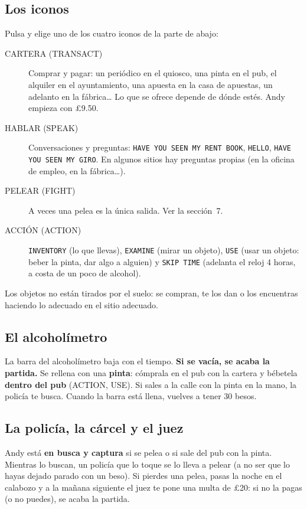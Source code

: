 \subsection*{Los iconos}
Pulsa  y elige uno de los cuatro iconos de la parte de abajo:

\begin{description}
\item[CARTERA (TRANSACT)] Comprar y pagar: un peri\'odico en el quiosco, una pinta en el pub, el alquiler en el ayuntamiento, una apuesta en la casa de apuestas, un adelanto en la f\'abrica\ldots{} Lo que se ofrece depende de d\'onde est\'es. Andy empieza con \pounds 9.50.
\item[HABLAR (SPEAK)] Conversaciones y preguntas: \texttt{HAVE YOU SEEN MY RENT BOOK}, \texttt{HELLO}, \texttt{HAVE YOU SEEN MY GIRO}. En algunos sitios hay preguntas propias (en la oficina de empleo, en la f\'abrica\ldots).
\item[PELEAR (FIGHT)] A veces una pelea es la \'unica salida. Ver la secci\'on~7.
\item[ACCI\'ON (ACTION)] \texttt{INVENTORY} (lo que llevas), \texttt{EXAMINE} (mirar un objeto), \texttt{USE} (usar un objeto: beber la pinta, dar algo a alguien) y \texttt{SKIP TIME} (adelanta el reloj 4 horas, a costa de un poco de alcohol).
\end{description}

Los objetos no est\'an tirados por el suelo: se compran, te los dan o los encuentras haciendo lo adecuado en el sitio adecuado.

\subsection*{El alcohol\'imetro}
La barra del alcohol\'imetro baja con el tiempo. \textbf{Si se vac\'ia, se acaba la partida.} Se rellena con una \textbf{pinta}: c\'omprala en el pub con la cartera y b\'ebetela \textbf{dentro del pub} (ACTION, USE). Si sales a la calle con la pinta en la mano, la polic\'ia te busca. Cuando la barra est\'a llena, vuelves a tener 30 besos.

\subsection*{La polic\'ia, la c\'arcel y el juez}
Andy est\'a \textbf{en busca y captura} si se pelea o si sale del pub con la pinta. Mientras lo buscan, un polic\'ia que lo toque se lo lleva a pelear (a no ser que lo hayas dejado parado con un beso). Si pierdes una pelea, pasas la noche en el calabozo y a la ma\~nana siguiente el juez te pone una multa de \pounds 20: si no la pagas (o no puedes), se acaba la partida.

